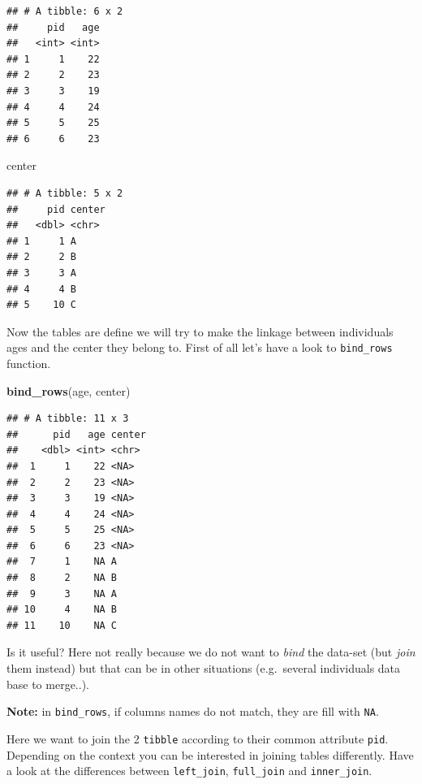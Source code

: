 \documentclass[
]{book}
\newenvironment{Shaded}{\begin{snugshade}}{\end{snugshade}}
\newcommand{\FunctionTok}[1]{\textcolor[rgb]{0.13,0.29,0.53}{\textbf{#1}}}
\newcommand{\NormalTok}[1]{#1}
\begin{document}
\begin{verbatim}
## # A tibble: 6 x 2
##     pid   age
##   <int> <int>
## 1     1    22
## 2     2    23
## 3     3    19
## 4     4    24
## 5     5    25
## 6     6    23
\end{verbatim}

\begin{Shaded}
\begin{Highlighting}[]
\NormalTok{center}
\end{Highlighting}
\end{Shaded}

\begin{verbatim}
## # A tibble: 5 x 2
##     pid center
##   <dbl> <chr> 
## 1     1 A     
## 2     2 B     
## 3     3 A     
## 4     4 B     
## 5    10 C
\end{verbatim}

Now the tables are define we will try to make the linkage between individuals ages and the center
they belong to.
First of all let's have a look to \texttt{bind\_rows} function.

\begin{Shaded}
\begin{Highlighting}[]
\FunctionTok{bind\_rows}\NormalTok{(age, center)}
\end{Highlighting}
\end{Shaded}

\begin{verbatim}
## # A tibble: 11 x 3
##      pid   age center
##    <dbl> <int> <chr> 
##  1     1    22 <NA>  
##  2     2    23 <NA>  
##  3     3    19 <NA>  
##  4     4    24 <NA>  
##  5     5    25 <NA>  
##  6     6    23 <NA>  
##  7     1    NA A     
##  8     2    NA B     
##  9     3    NA A     
## 10     4    NA B     
## 11    10    NA C
\end{verbatim}

Is it useful?
Here not really because we do not want to \emph{bind} the data-set (but \emph{join} them instead) but that can be in other situations (e.g.~several individuals data base to merge..).

\textbf{Note:} in \texttt{bind\_rows}, if columns names do not match, they are fill with \texttt{NA}.

Here we want to join the 2 \texttt{tibble} according to their common attribute \texttt{pid}. Depending
on the context you can be interested in joining tables differently. Have a look at the differences
between \texttt{left\_join}, \texttt{full\_join} and \texttt{inner\_join}.
\end{document}
